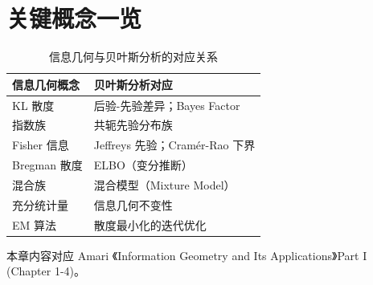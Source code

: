 %

%

\section{关键概念一览}\label{sec:summary}

\begin{table}[h]
    \centering
    \begin{tabular}{|l|l|}
        \hline
        \textbf{信息几何概念} & \textbf{贝叶斯分析对应} \\
        \hline
        KL 散度 & 后验-先验差异；Bayes Factor \\
        指数族 & 共轭先验分布族 \\
        Fisher 信息 & Jeffreys 先验；Cramér-Rao 下界 \\
        Bregman 散度 & ELBO（变分推断） \\
        混合族 & 混合模型（Mixture Model） \\
        充分统计量 & 信息几何不变性 \\
        EM 算法 & 散度最小化的迭代优化 \\
        \hline
    \end{tabular}
    \caption{信息几何与贝叶斯分析的对应关系}
    \label{tab:ig-bayes}
\end{table}


\begin{Remark}
    本章内容对应 Amari 《Information Geometry and Its Applications》Part I (Chapter 1-4)。
\end{Remark}
